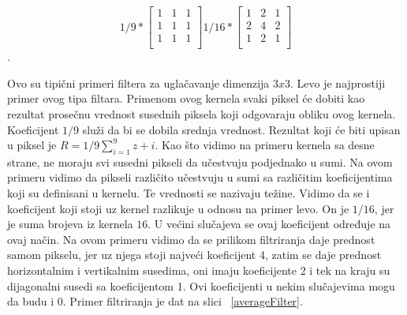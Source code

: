 \documentclass[a4paper,12pt,titlepage]{article}
\begin{document}
\[
1/9
*
\begin{bmatrix}
     1 & 1 & 1 \\
     1 & 1 & 1 \\
     1 & 1 & 1 \\
\end{bmatrix}
1/16
*
\begin{bmatrix}
     1 & 2 & 1 \\
     2 & 4 & 2 \\
     1 & 2 & 1 \\
\end{bmatrix}
\].   
  
Ovo su tipični primeri filtera za uglačavanje dimenzija $3 x 3$. Levo je najprostiji primer ovog tipa filtara. Primenom ovog kernela svaki piksel će dobiti kao rezultat prosečnu vrednost susednih piksela koji odgovaraju obliku ovog kernela. Koeficijent $1/9$ služi da bi se dobila srednja vrednost. Rezultat koji će biti upisan u piksel je $R = 1/9 \sum_{i = 1}^{9} z+{i}$. Kao što vidimo na primeru kernela sa desne strane, ne moraju svi susedni pikseli da učestvuju podjednako u sumi. Na ovom primeru vidimo da pikseli različito učestvuju u sumi sa različitim koeficijentima koji su definisani u kernelu. Te vrednosti se nazivaju težine. Vidimo da se i koeficijent koji stoji uz kernel razlikuje u odnosu na primer levo. On je $1/16$, jer je suma brojeva iz kernela $16$. U većini slučajeva se ovaj koeficijent određuje na ovaj način. Na ovom primeru vidimo da se prilikom filtriranja daje prednost samom pikselu, jer uz njega stoji najveći koeficijent 4, zatim se daje prednost horizontalnim i vertikalnim susedima, oni imaju koeficijente 2 i tek na kraju su dijagonalni susedi sa koeficijentom 1. Ovi koeficijenti u nekim slučajevima mogu da budu i 0. Primer filtriranja je dat na slici ~\ref{averageFilter}.
\end{document}
